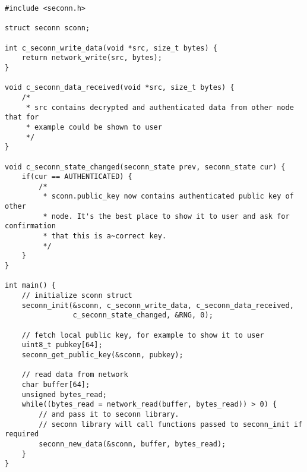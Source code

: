 \label{tab:sample-usage}
\begin{lstlisting}
#include <seconn.h>

struct seconn sconn;

int c_seconn_write_data(void *src, size_t bytes) {
    return network_write(src, bytes);
}

void c_seconn_data_received(void *src, size_t bytes) {
    /*
     * src contains decrypted and authenticated data from other node that for
     * example could be shown to user
     */
}

void c_seconn_state_changed(seconn_state prev, seconn_state cur) {
    if(cur == AUTHENTICATED) {
        /*
         * sconn.public_key now contains authenticated public key of other
         * node. It's the best place to show it to user and ask for confirmation
         * that this is a~correct key.
         */
    }
}

int main() {
    // initialize sconn struct
    seconn_init(&sconn, c_seconn_write_data, c_seconn_data_received,
                c_seconn_state_changed, &RNG, 0);

    // fetch local public key, for example to show it to user
    uint8_t pubkey[64];
    seconn_get_public_key(&sconn, pubkey);

    // read data from network
    char buffer[64];
    unsigned bytes_read;
    while((bytes_read = network_read(buffer, bytes_read)) > 0) {
        // and pass it to seconn library.
        // seconn library will call functions passed to seconn_init if required
        seconn_new_data(&sconn, buffer, bytes_read);
    }
}
\end{lstlisting}
\FloatBarrier


